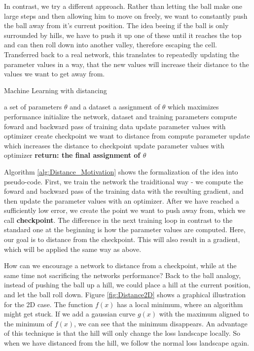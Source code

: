 In contrast, we try a different approach. Rather than letting the ball make one
large steps and then allowing him to move on freely, we want to constantly push
the ball away from it's current position. The idea beeing if the ball is only
surrounded by hills, we have to push it up one of these until it reaches the top
and can then roll down into another valley, therefore escaping the cell.
Transferred back to a real network, this translates to repeatedly updating the
parameter values in a way, that the new values will increase their distance to
the values we want to get away from.


\begin{algorithm}\label{alg:Distance_Motivation}
    \begin{algorithmic}[1]
        \caption{Machine Learning with distancing}
        \REQUIRE a set of parameters $\theta$ and a dataset
        \ENSURE a assignment of $\theta$ which maximizes performance
        \STATE initialize the network, dataset and training parameters
            \STATE compute foward and backward pass of training data
            \STATE update parameter values with optimizer
        \ENDFOR
        \STATE create checkpoint we want to distance from
			\STATE compute parameter update which increases the distance to checkpoint
			\ENDFOR
		\STATE update parameter values with optimizer
        \ENDFOR
        \STATE \textbf{return: the final assignment of $\theta$}
    \end{algorithmic}
\end{algorithm}

Algorithm \ref{alg:Distance_Motivation} shows the formalization of the idea into
pseudo-code. First, we train the network the traiditional way - we compute the
foward and backward pass of the training data with the resulting gradient, and
then update the parameter values with an optimizer. After we have reached a
sufficiently low error, we create the point we want to push away from, which we
call \textbf{checkpoint}. The difference in the next training loop in contrast
to the standard one at the beginning is how the parameter values are computed.
Here, our goal is to distance from the checkpoint. This will also result in a
gradient, which will be applied the same way as above.

How can we encourage a network to distance from a checkpoint, while at the same
time not sacrificing the networks performance? Back to the ball analogy, instead
of pushing the ball up a hill, we could place a hill at the current position,
and let the ball roll down. Figure \ref{fig:Distance2D} shows a graphical
illustration for the 2D case. The function $f(x)$ has a local minimum, where an
algorithm might get stuck. If we add a gaussian curve $g(x)$ with the maximum
aligned to the minimum of $f(x)$, we can see that the minimum disappears. An
advantage of this technique is that the hill will only change the loss landscape
locally. So when we have distanced from the hill, we follow the normal loss
landscape again.

